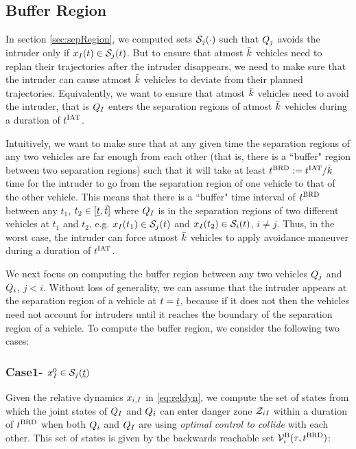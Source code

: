 \subsection{Buffer Region} \label{sec:buffRegion}
In section \ref{sec:sepRegion}, we computed sets $\mathcal{S}_j(\cdot)$ such that $Q_j$ avoids the intruder only if $x_{I}(t) \in \mathcal{S}_j(t)$. But to ensure that atmost $\bar{k}$ vehicles need to replan their trajectories after the intruder disappears, we need to make sure that the intruder can cause atmost $\bar{k}$ vehicles to deviate from their planned trajectories. Equivalently, we want to ensure that atmost $\bar{k}$ vehicles need to avoid the intruder, that is $Q_{I}$ enters the separation regions of atmost $\bar{k}$ vehicles during a duration of $t^\text{IAT}$.

Intuitively, we want to make sure that at any given time the separation regions of any two vehicles are far enough from each other (that is, there is a ``buffer" region between two separation regions) such that it will take at least $t^\text{BRD} := t^\text{IAT} / \bar{k}$ time for the intruder to go from the separation region of one vehicle to that of the other vehicle. This means that there is a ``buffer" time interval of $t^\text{BRD}$ between any $t_1$, $t_2 \in [\underline{t}, \bar{t}]$ where $Q_{I}$ is in the separation regions of two different vehicles at $t_1$ and $t_2$, e.g. $x_{I}(t_1) \in \mathcal{S}_j(t)$ and $x_{I}(t_2) \in \mathcal{S}_i(t)$, $i \neq j$. Thus, in the worst case, the intruder can force atmost $\bar{k}$ vehicles to apply avoidance maneuver during a duration of $t^\text{IAT}$. 

We next focus on computing the buffer region between any two vehicles $Q_j$ and $Q_i$, $j < i$. Without loss of generality, we can assume that the intruder appears at the separation region of a vehicle at $t = \underline{t}$, because if it does not then the vehicles need not account for intruders until it reaches the boundary of the separation region of a vehicle. To compute the buffer region, we consider the following two cases:     

\subsubsection{Case1- $x_{I}^0 \in \mathcal{S}_j(\underline{t})$} \label{sec:buffCase1}
Given the relative dynamics $x_{i, I}$ in \eqref{eq:reldyn}, we compute the set of states from which the joint states of $Q_{I}$ and $Q_{i}$ can enter danger zone $\mathcal{Z}_{iI}$ within a duration of $t^\text{BRD}$ when both $Q_{i}$ and $Q_{I}$ are using \textit{optimal control to collide} with each other. This set of states is given by the backwards reachable set $\mathcal{V}^{\text{B}}_i(\tau, t^\text{BRD})$:

